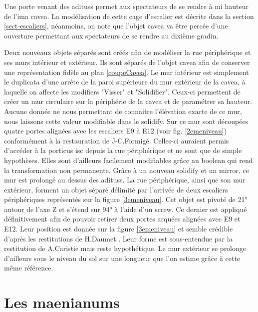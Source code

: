 Une porte venant des \glspl{aditus} permet aux spectateurs de se rendre à mi hauteur de l'\gls{ima cavea}. La modélisation de cette cage d'escalier est décrite dans la section \ref{sect-escaliers}, néanmoins, on note que l'objet \gls{cavea} va être percée d'une ouverture permettant aux spectateurs de se rendre au dixième gradin.

Deux nouveaux objets séparés sont créés afin de modéliser la rue périphérique et ses murs intérieur et extérieur. Ils sont séparés de l'objet \gls{cavea} afin de conserver une représentation fidèle au plan \ref{coupeCavea}. Le mur intérieur est simplement le duplicata d'une arrête de la paroi supérieure du mur extérieur de la \gls{cavea}, à laquelle on affecte les \glspl{modifier} "Visser" et "Solidifier". Ceux-ci permettent de créer un mur circulaire sur la périphérie de la \gls{cavea} et de paramétrer sa hauteur. Aucune donnée ne nous permettant de connaitre l'élévation exacte de ce mur, nous laissons cette valeur modifiable dans le \gls{solidify}. Sur ce mur sont découpées quatre portes alignées avec les escaliers E9 à E12 (voir fig. \ref{2emeniveau}) conformément à la restauration de J-C.Formigé. Celles-ci auraient permis d'accéder à la \gls{porticus isc} depuis la rue périphérique et ne sont que de simple hypothèses. Elles sont d'ailleurs facilement modifiables grâce au \gls{boolean} qui rend la transformation non permanente. Grâce à un nouveau \gls{solidify} et un \gls{mirror}, ce mur est prolongé au dessus des \glspl{aditus}. La rue périphérique, ainsi que son mur extérieur, forment un objet séparé délimité par l'arrivée de deux escaliers périphériques représentés sur la figure \ref{3emeniveau}. Cet objet est pivoté de 21° autour de l'axe Z et s'étend sur 94° à l'aide d'un \gls{screw}. Ce dernier est appliqué définitivement afin de pouvoir retirer deux portes arquées alignées avec E9 et E12. Leur position est donnée sur la figure \ref{3emeniveau} et semble crédible d'après les restitutions de H.Daumet \cite[Pl. VII]{orangePl}. Leur forme est sous-entendue par la restitution de A.Caristie \cite[Pl. VI]{orangePl} mais reste hypothétique. Le mur extérieur se prolonge d'ailleurs sous le niveau du sol sur une longueur que l'on estime grâce à cette même référence. 


\section{Les  \glspl{maenianum}} \label{sect-maenianum}

